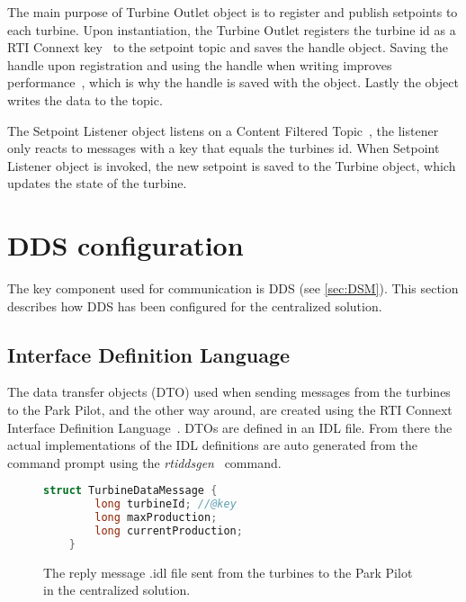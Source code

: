 The main purpose of Turbine Outlet object is to register and publish setpoints to each turbine. Upon instantiation, the Turbine Outlet registers the turbine id as a RTI Connext key~\cite{rtiConnextUsersManual} to the setpoint topic and saves the handle object. Saving the handle upon registration and using the handle when writing improves performance~\cite{DDSInstanceHandlet}, which is why the handle is saved with the object. Lastly the object writes the data to the topic.

The Setpoint Listener object listens on a Content Filtered Topic~\cite{rtiConnextUsersManual}, the listener only reacts to messages with a key that equals the turbines id. When Setpoint Listener object is invoked, the new setpoint is saved to the Turbine object, which updates the state of the turbine.

\section{DDS configuration}\label{sec:ddsConfigCen} 

The key component used for communication is DDS (see \cref{sec:DSM}). This section describes how DDS has been configured for the centralized solution.

\subsection{Interface Definition Language}\label{sec:cenIdl}

The data transfer objects (DTO) used when sending messages from the turbines to the Park Pilot, and the other way around, are created using the RTI Connext Interface Definition Language~\cite{rtiConnextUsersManual}. DTOs are defined in an IDL file. From there the actual implementations of the IDL definitions are auto generated from the command prompt using the \textit{rtiddsgen}~\cite{rtiConnextUsersManual} command.

\begin{figure}[!h]
	\centering
	\begin{lstlisting}[language=C++,tabsize=2,basicstyle=\small]
	struct TurbineDataMessage {
		long turbineId; //@key
		long maxProduction;
		long currentProduction;	
	}	
	\end{lstlisting}
	\caption[Centralized turbine reply message]{
		\label{fig:cenTurbineDataMessage} 
		\footnotesize{%
			The reply message .idl file sent from the turbines to the Park Pilot in the centralized solution.
		}
	}
\end{figure}


